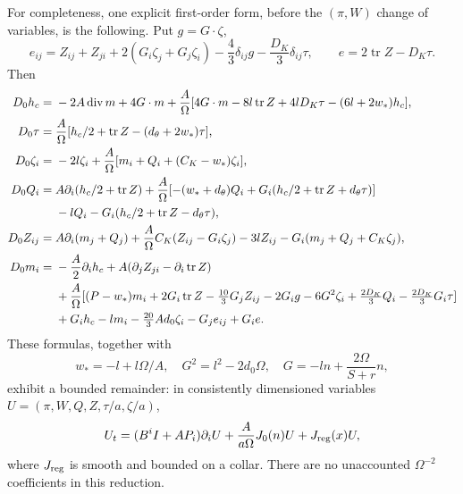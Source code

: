 \documentclass[11pt]{article}
\newcommand{\Tr}{\operatorname{tr}}
\begin{document}
For completeness, one explicit first-order form, before the
$(\pi,W)$ change of variables, is the following. Put $g=G\cdot\zeta$,
\[
e_{ij}=Z_{ij}+Z_{ji}+2(G_i\zeta_j+G_j\zeta_i)
-\frac43\delta_{ij}g-\frac{D_K}{3}\delta_{ij}\tau,\qquad
e=2\Tr Z-D_K\tau .
\]
Then
\begin{align}
D_0h_c={}&-2A\operatorname{div}m+4G\cdot m
+\frac A\Omega[4G\cdot m-8l\Tr Z+4lD_K\tau
-(6l+2w_*)h_c],\\
D_0\tau={}&\frac A\Omega[h_c/2+\Tr Z-(d_\theta+2w_*)\tau],\\
D_0\zeta_i={}&-2l\zeta_i+
\frac A\Omega[m_i+Q_i+(C_K-w_*)\zeta_i],\\
D_0Q_i={}&A\partial_i(h_c/2+\Tr Z)
+\frac A\Omega[-(w_*+d_\theta)Q_i
+G_i(h_c/2+\Tr Z+d_\theta\tau)]\notag\\
&-lQ_i-G_i(h_c/2+\Tr Z-d_\theta\tau),\\
D_0Z_{ij}={}&A\partial_i(m_j+Q_j)
+\frac A\Omega C_K(Z_{ij}-G_i\zeta_j)
-3lZ_{ij}-G_i(m_j+Q_j+C_K\zeta_j),\\
D_0m_i={}&-\frac A2\partial_i h_c
+A(\partial_jZ_{ji}-\partial_i\Tr Z)\notag\\
&+\frac A\Omega[(P-w_*)m_i+2G_i\Tr Z-\tfrac{10}3G_jZ_{ij}
-2G_i g-6G^2\zeta_i+\tfrac{2D_K}3Q_i-\tfrac{2D_K}3G_i\tau]\notag\\
&+G_i h_c-lm_i-\tfrac{20}3Ad_0\zeta_i-G_je_{ij}+G_i e.
\end{align}
These formulas, together with
\[
w_*=-l+l\Omega/A,\quad G^2=l^2-2d_0\Omega,\quad
G=-ln+\frac{2\Omega}{S+r}n,
\]
exhibit a bounded remainder: in consistently dimensioned variables
$U=(\pi,W,Q,Z,\tau/a,\zeta/a)$,
\[
U_t=(B^iI+AP_i)\partial_iU+
\frac{A}{a\Omega}J_0(n)U+J_{\rm reg}(x)U,
\]
where $J_{\rm reg}$ is smooth and bounded on a collar. There are no
unaccounted $\Omega^{-2}$ coefficients in this reduction.
\end{document}
